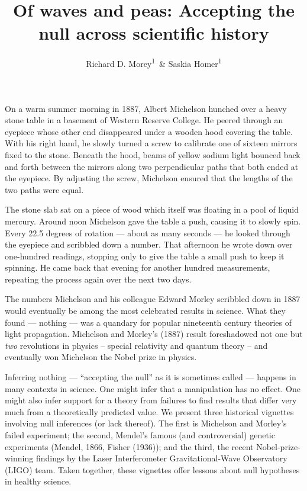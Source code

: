 \documentclass[english,floatsintext,man]{apa6}
\title{Of waves and peas: Accepting the null across scientific history}
\author{Richard D. Morey\textsuperscript{1}~\& Saskia Homer\textsuperscript{1}}
\affiliation{
    \vspace{0.5cm}
          \textsuperscript{1} School of Psychology, Cardiff University  }
\theoremstyle{definition}
\theoremstyle{definition}
\theoremstyle{definition}
\theoremstyle{remark}
\begin{document}
\maketitle

\setcounter{secnumdepth}{0}



On a warm summer morning in 1887, Albert Michelson hunched over a heavy
stone table in a basement of Western Reserve College. He peered through
an eyepiece whose other end disappeared under a wooden hood covering the
table. With his right hand, he slowly turned a screw to calibrate one of
sixteen mirrors fixed to the stone. Beneath the hood, beams of yellow
sodium light bounced back and forth between the mirrors along two
perpendicular paths that both ended at the eyepiece. By adjusting the
screw, Michelson ensured that the lengths of the two paths were equal.

The stone slab sat on a piece of wood which itself was floating in a
pool of liquid mercury. Around noon Michelson gave the table a push,
causing it to slowly spin. Every 22.5 degrees of rotation --- about as
many seconds --- he looked through the eyepiece and scribbled down a
number. That afternoon he wrote down over one-hundred readings, stopping
only to give the table a small push to keep it spinning. He came back
that evening for another hundred measurements, repeating the process
again over the next two days.

The numbers Michelson and his colleague Edward Morley scribbled down in
1887 would eventually be among the most celebrated results in science.
What they found --- nothing --- was a quandary for popular nineteenth
century theories of light propagation. Michelson and Morley's (1887)
result foreshadowed not one but \emph{two} revolutions in physics --
special relativity and quantum theory -- and eventually won Michelson
the Nobel prize in physics.

Inferring nothing --- \enquote{accepting the null} as it is sometimes
called --- happens in many contexts in science. One might infer that a
manipulation has no effect. One might also infer support for a theory
from failures to find results that differ very much from a theoretically
predicted value. We present three historical vignettes involving null
inferences (or lack thereof). The first is Michelson and Morley's failed
experiment; the second, Mendel's famous (and controversial) genetic
experiments (Mendel, 1866, Fisher (1936)); and the third, the recent
Nobel-prize-winning findings by the Laser Interferometer
Gravitational-Wave Observatory (LIGO) team. Taken together, these
vignettes offer lessons about null hypotheses in healthy science.
\end{document}
